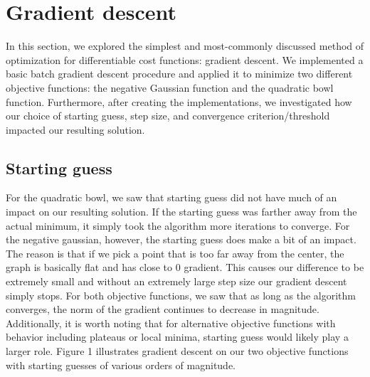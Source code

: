 \documentclass{article}
\begin{document}

\section{Gradient descent}
In this section, we explored the simplest and most-commonly discussed method of optimization for differentiable cost functions: gradient descent. We implemented a basic batch gradient descent procedure and applied it to minimize two different objective functions: the negative Gaussian function and the quadratic bowl function. Furthermore, after creating the implementations, we investigated how our choice of starting guess, step size, and convergence criterion/threshold impacted our resulting solution.

\subsection{Starting guess}

For the quadratic bowl, we saw that starting guess did not have much of an impact on our resulting solution. If the starting guess was farther away from the actual minimum, it simply took the algorithm more iterations to converge. For the negative gaussian, however, the starting guess does make a bit of an impact. The reason is that if we pick a point that is too far away from the center, the graph is basically flat and has close to 0 gradient. This causes our difference to be extremely small and without an extremely large step size our gradient descent simply stops. For both objective functions, we saw that as long as the algorithm converges, the norm of the gradient continues to decrease in magnitude. Additionally, it is worth noting that for alternative objective functions with behavior including plateaus or local minima, starting guess would likely play a larger role. Figure 1 illustrates gradient descent on our two objective functions with starting guesses of various orders of magnitude.
\end{document}

